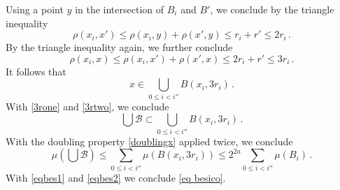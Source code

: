 {Using a point $y$ in the intersection of $B_i$ and $B'$,
we conclude by the triangle inequality
\begin{equation}
   \rho(x_i,x')\le \rho(x_i,y)+\rho(x',y)\le r_i+r'\le 2r_i \, .
\end{equation}
By the triangle inequality again, we further conclude
\begin{equation}
   \rho(x_i,x)\le \rho(x_i,x')+\rho(x',x)\le 2r_i+r'\le 3r_i \, .
\end{equation}
It follows that
\begin{equation}\label{3rtwo}
    x\in  \bigcup _{0\le i< i''}B(x_i,3r_i)\, .
\end{equation}
With \eqref{3rone} and \eqref{3rtwo}, we conclude
\begin{equation}
\bigcup \mathcal{B}\subset
\bigcup _{0\le i< i''}B(x_i,3r_i)\, .
\end{equation}
With the doubling property
\eqref{doublingx} applied twice, we conclude
\begin{equation}\label{eqbes2}
    \mu(\bigcup{\mathcal{B}})
    \le \sum _{0\le i< i''}\mu (B(x_i,3r_i))
    \le 2^{2a}\sum _{0\le i< i''}\mu (B_i)\, .
\end{equation}
With \eqref{eqbes1} and \eqref{eqbes2} we conclude
\eqref{eq besico}.


}
